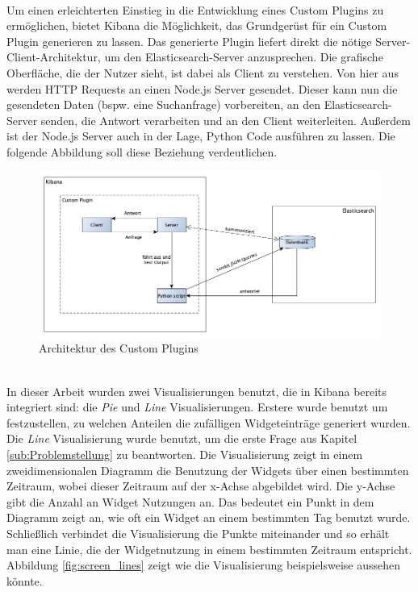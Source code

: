 \\
Um einen erleichterten Einstieg in die Entwicklung eines Custom Plugins zu ermöglichen, bietet Kibana die Möglichkeit, das Grundgerüst für ein Custom Plugin generieren zu lassen. Das generierte Plugin liefert direkt die nötige Server-Client-Architektur, um den Elasticsearch-Server anzusprechen. Die grafische Oberfläche, die der Nutzer sieht, ist dabei als Client zu verstehen. Von hier aus werden HTTP Requests an einen Node.js Server gesendet. Dieser kann nun die gesendeten Daten (bspw. eine Suchanfrage) vorbereiten, an den Elasticsearch-Server senden, die Antwort verarbeiten und an den Client weiterleiten. Außerdem ist der Node.js Server auch in der Lage, Python Code ausführen zu lassen. Die folgende Abbildung soll diese Beziehung verdeutlichen. 
\begin{figure}[htb]
\begin{center}
	\includegraphics[width=430pt]{bilder/custom_plugin.png}
\end{center}
\caption{Architektur des Custom Plugins}
\label{fig:custom_plugin}
\end{figure}


\\
In dieser Arbeit wurden zwei Visualisierungen benutzt, die in Kibana bereits integriert sind: die \textit{Pie} und \textit{Line} Visualisierungen. Erstere wurde benutzt um festzustellen, zu welchen Anteilen die zufälligen Widgeteinträge generiert wurden.\\
Die \textit{Line} Visualisierung wurde benutzt, um die erste Frage aus Kapitel \ref{sub:Problemstellung} zu beantworten. Die Visualisierung zeigt in einem zweidimensionalen Diagramm die Benutzung der Widgets über einen bestimmten Zeitraum, wobei dieser Zeitraum auf der x-Achse abgebildet wird. Die y-Achse gibt die Anzahl an Widget Nutzungen an. Das bedeutet ein Punkt in dem Diagramm zeigt an, wie oft ein Widget an einem bestimmten Tag benutzt wurde. Schließlich verbindet die Visualisierung die Punkte miteinander und so erhält man eine Linie, die der Widgetnutzung in einem bestimmten Zeitraum entspricht. Abbildung \ref{fig:screen_lines} zeigt wie die Visualisierung beispielsweise aussehen könnte.

